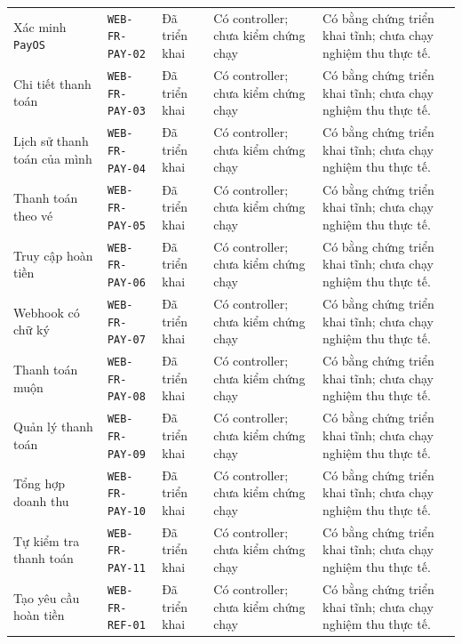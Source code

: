 \begin{longtable}{@{}P{0.19000\SRSWidth}P{0.18000\SRSWidth}P{0.15000\SRSWidth}P{0.20000\SRSWidth}P{0.28000\SRSWidth}@{}}
Xác minh \texttt{Pay\allowbreak{}OS} & \texttt{WEB-\allowbreak{}FR-\allowbreak{}PAY-\allowbreak{}02} & Đã triển khai & Có controller; chưa kiểm chứng chạy & Có bằng chứng triển khai tĩnh; chưa chạy nghiệm thu thực tế. \\[3pt]
Chi tiết thanh toán & \texttt{WEB-\allowbreak{}FR-\allowbreak{}PAY-\allowbreak{}03} & Đã triển khai & Có controller; chưa kiểm chứng chạy & Có bằng chứng triển khai tĩnh; chưa chạy nghiệm thu thực tế. \\[3pt]
Lịch sử thanh toán của mình & \texttt{WEB-\allowbreak{}FR-\allowbreak{}PAY-\allowbreak{}04} & Đã triển khai & Có controller; chưa kiểm chứng chạy & Có bằng chứng triển khai tĩnh; chưa chạy nghiệm thu thực tế. \\[3pt]
Thanh toán theo vé & \texttt{WEB-\allowbreak{}FR-\allowbreak{}PAY-\allowbreak{}05} & Đã triển khai & Có controller; chưa kiểm chứng chạy & Có bằng chứng triển khai tĩnh; chưa chạy nghiệm thu thực tế. \\[3pt]
Truy cập hoàn tiền & \texttt{WEB-\allowbreak{}FR-\allowbreak{}PAY-\allowbreak{}06} & Đã triển khai & Có controller; chưa kiểm chứng chạy & Có bằng chứng triển khai tĩnh; chưa chạy nghiệm thu thực tế. \\[3pt]
Webhook có chữ ký & \texttt{WEB-\allowbreak{}FR-\allowbreak{}PAY-\allowbreak{}07} & Đã triển khai & Có controller; chưa kiểm chứng chạy & Có bằng chứng triển khai tĩnh; chưa chạy nghiệm thu thực tế. \\[3pt]
Thanh toán muộn & \texttt{WEB-\allowbreak{}FR-\allowbreak{}PAY-\allowbreak{}08} & Đã triển khai & Có controller; chưa kiểm chứng chạy & Có bằng chứng triển khai tĩnh; chưa chạy nghiệm thu thực tế. \\[3pt]
Quản lý thanh toán & \texttt{WEB-\allowbreak{}FR-\allowbreak{}PAY-\allowbreak{}09} & Đã triển khai & Có controller; chưa kiểm chứng chạy & Có bằng chứng triển khai tĩnh; chưa chạy nghiệm thu thực tế. \\[3pt]
Tổng hợp doanh thu & \texttt{WEB-\allowbreak{}FR-\allowbreak{}PAY-\allowbreak{}10} & Đã triển khai & Có controller; chưa kiểm chứng chạy & Có bằng chứng triển khai tĩnh; chưa chạy nghiệm thu thực tế. \\[3pt]
Tự kiểm tra thanh toán & \texttt{WEB-\allowbreak{}FR-\allowbreak{}PAY-\allowbreak{}11} & Đã triển khai & Có controller; chưa kiểm chứng chạy & Có bằng chứng triển khai tĩnh; chưa chạy nghiệm thu thực tế. \\[3pt]
Tạo yêu cầu hoàn tiền & \texttt{WEB-\allowbreak{}FR-\allowbreak{}REF-\allowbreak{}01} & Đã triển khai & Có controller; chưa kiểm chứng chạy & Có bằng chứng triển khai tĩnh; chưa chạy nghiệm thu thực tế. \\[3pt]

\end{longtable}
